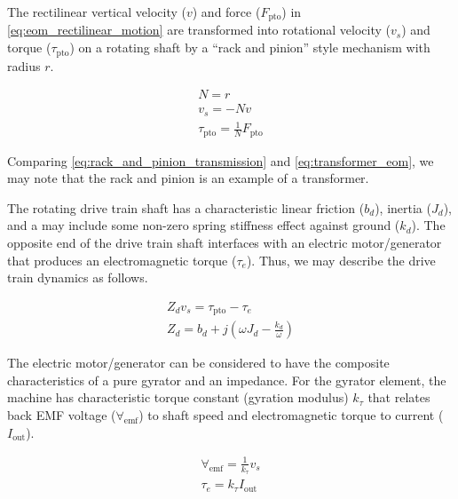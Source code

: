 \documentclass[lettersize,journal]{IEEEtran}
\begin{document}
The rectilinear vertical velocity ($v$) and force ($F_{\textrm{pto}}$) in \eqref{eq:eom_rectilinear_motion} are transformed into rotational velocity ($v_s$) and torque ($\tau_{\textrm{pto}}$) on a rotating shaft by a ``rack and pinion'' style mechanism with radius $r$.

\begin{subequations}
        \begin{gather}
                N = r \\
                v_s = -N v \\
                \tau_{\textrm{pto}} = \frac{1}{N} F_{\textrm{pto}}
        \end{gather}
        \label{eq:rack_and_pinion_transmission}
\end{subequations}

\noindent{}Comparing \eqref{eq:rack_and_pinion_transmission} and \eqref{eq:transformer_eom}, we may note that the rack and pinion is an example of a transformer.

The rotating drive train shaft has a characteristic linear friction ($b_d$), inertia ($J_d$), and a may include some non-zero spring stiffness effect against ground ($k_d$).
The opposite end of the drive train shaft interfaces with an electric motor/generator that produces an electromagnetic torque ($\tau_e$).
Thus, we may describe the drive train dynamics as follows.

\begin{subequations}
        \begin{gather}
                Z_d v_s = \tau_{\textrm{pto}} - \tau_e \\
                Z_d = b_d + j \left( \omega J_d - \frac{k_d}{\omega} \right)
        \end{gather}
\end{subequations}

The electric motor/generator can be considered to have the composite characteristics of a pure gyrator and an impedance.
For the gyrator element, the machine has characteristic torque constant (gyration modulus) $k_\tau$ that relates back EMF voltage ($\forall_{\textrm{emf}}$) to shaft speed and electromagnetic torque to current ($I_{\textrm{out}}$).

\begin{subequations}
        \begin{gather}
                \forall_{\textrm{emf}} = \frac{1}{k_\tau} v_s \\
                \tau_e = k_\tau I_{\textrm{out}}
        \end{gather}
\end{subequations}
\end{document}
